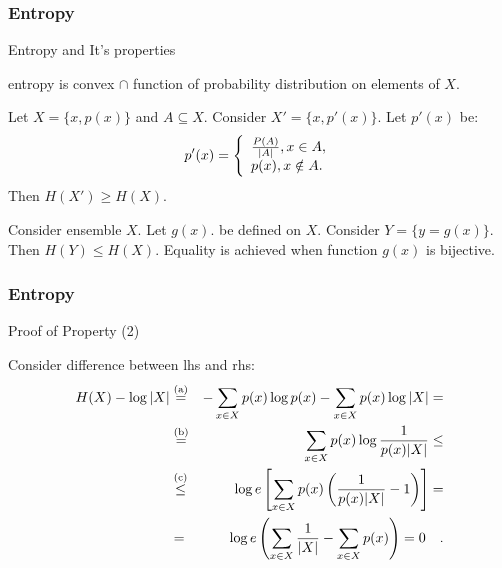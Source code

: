 \documentclass[14pt]{beamer}
\begin{document}
\begin{frame}
\frametitle{Entropy}
Entropy and It's properties
\begin{itemize}
\small{

    \item[5]
    \begin{prop}
    \label{E5}
    entropy is convex $ \cap $ function of probability distribution on elements of $X$.
    \end{prop}

    \item[6]
    \begin{prop}
    \label{E6}
    Let $X = \{x,p(x)\}$ and $A \subseteq X.$ Consider $X' = \{x,{p}'(x)\}$. Let ${p}'(x)$ be:
    \[
    {p}'(x) = \left\{ {{\begin{array}{*{20}c}
     {\frac{P(A)}{\vert A\vert },x \in A,} \hfill \\
     {p(x),x \notin A.} \hfill \\
    \end{array} }} \right.
    \]
    Then $H(X') \ge H(X).$ 
    \end{prop}

    \item[7]
    \begin{prop}\label{E7}
    Consider ensemble $X$. Let $g(x).$  be defined on $X$. Consider $Y = \{y = g(x)\}$. Then $H(Y) \le H(X)$. 
    Equality is achieved when function $g(x)$ is bijective.
    \end{prop}
}
\end{itemize}
\end{frame}



\begin{frame}
\frametitle{Entropy}
Proof of Property (2)
\begin{itemize}
\small{

    \item Consider difference between lhs and rhs:
    \begin{eqnarray}
    H(X)-\log \vert X\vert %
    &\stackrel{\rm (a)}{=}& - \sum\limits_{x \in X} {p(x)\log
    p(x)-\sum\limits_{x \in X} {p(x)\log \left| X \right|} }=\nonumber\\
    & \stackrel{\rm (b)}{=}&%
    \sum_{x \in X} %
    p(x)\log \frac{1}{p(x)\vert X\vert} \le \nonumber \\%
    &\stackrel{\rm (c)}{\le} &%
    \log e\left[ {\sum\limits_{x \in X} {p(x)\left( {\frac{1}{p(x)\vert
    X\vert } - 1} \right)} } \right] =\nonumber\\
    & = & \log e\left( \sum_{x \in X} \frac{1}{\vert X\vert }-\sum_{x\in
    X} p(x) \right) = 0\quad.\nonumber
    \end{eqnarray}
}

\end{itemize}
\end{frame}
\end{document}
